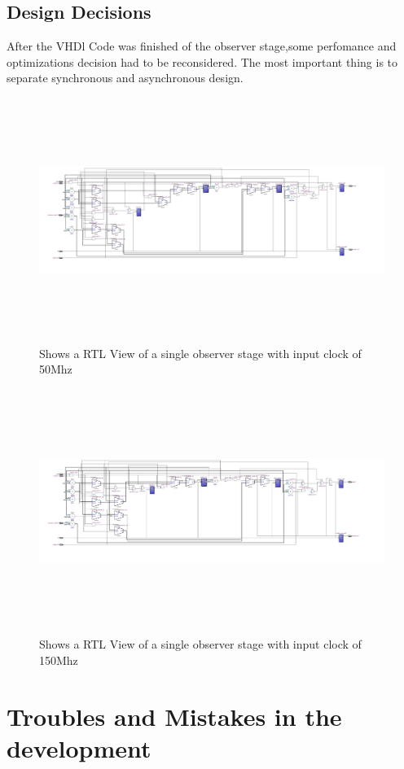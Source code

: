 \subsection{Design Decisions}

After the VHDl Code was finished of the observer stage,some perfomance and optimizations decision had to be reconsidered.
The most important thing is to separate synchronous and asynchronous design.

\begin{figure}[]
\centering
\includegraphics[width=650px,height=300px,angle=-90]{../../pictures/22.02.2014/onlyObserver/OBS_50M.jpg}
\caption[RTL View of Observer 0 with clock 50Mhz]{Shows a RTL View of a single observer stage with input clock of 50Mhz}
\label{fig:test:only:50:obs0}
\end{figure}


\begin{figure}[]
\centering
\includegraphics[width=650px,height=300px,angle=-90]{../../pictures/22.02.2014/onlyObserver/OBS_150M.jpg}
\caption[RTL View of Observer 0 with clock 150Mhz]{Shows a RTL View of a single observer stage with input clock of 150Mhz}
\label{fig:test:only:150:obs0}
\end{figure}


\section{Troubles and Mistakes in the development}
